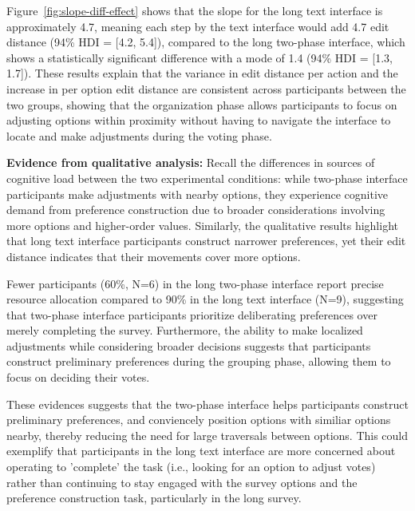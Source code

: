 Figure~\ref{fig:slope-diff-effect} shows that the slope for the long text interface is approximately 4.7, meaning each step by the text interface would add 4.7 edit distance (94\% HDI = [4.2, 5.4]), compared to the long two-phase interface, which shows a statistically significant difference with a mode of 1.4 (94\% HDI = [1.3, 1.7]). These results explain that the variance in edit distance per action and the increase in per option edit distance are consistent across participants between the two groups, showing that the organization phase allows participants to focus on adjusting options within proximity without having to navigate the interface to locate and make adjustments during the voting phase.

\textbf{Evidence from qualitative analysis:} Recall the differences in sources of cognitive load between the two experimental conditions: while two-phase interface participants make adjustments with nearby options, they experience cognitive demand from preference construction due to broader considerations involving more options and higher-order values. Similarly, the qualitative results highlight that long text interface participants construct narrower preferences, yet their edit distance indicates that their movements cover more options.

Fewer participants (60\%, N=6) in the long two-phase interface report precise resource allocation compared to 90\% in the long text interface (N=9), suggesting that two-phase interface participants prioritize deliberating preferences over merely completing the survey. Furthermore, the ability to make localized adjustments while considering broader decisions suggests that participants construct preliminary preferences during the grouping phase, allowing them to focus on deciding their votes.

These evidences suggests that the two-phase interface helps participants construct preliminary preferences, and conviencely position options with similiar options nearby, thereby reducing the need for large traversals between options. This could exemplify that participants in the long text interface are more concerned about operating to 'complete' the task (i.e., looking for an option to adjust votes) rather than continuing to stay engaged with the survey options and the preference construction task, particularly in the long survey.




